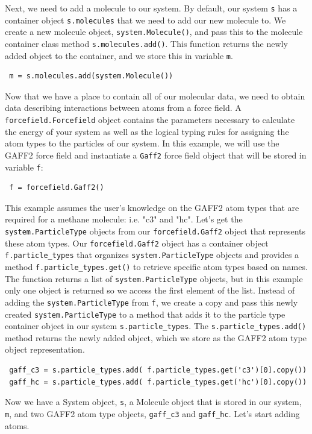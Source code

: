 \documentclass[9pt,tutorial]{livecoms}
\begin{document}
Next, we need to add a molecule to our system. By default, our system \lstinline$s$ has a container object \lstinline$s.molecules$ that we need to add our new molecule to. We create a new molecule object, \lstinline$system.Molecule()$, and pass this to the molecule container class method \lstinline$s.molecules.add()$. This function returns the newly added object to the container, and we store this in variable \lstinline$m$.

\begin{lstlisting}
 m = s.molecules.add(system.Molecule())
\end{lstlisting}

Now that we have a place to contain all of our molecular data, we need to obtain data describing interactions between atoms from a force field. A \lstinline$forcefield.Forcefield$ object contains the parameters necessary to calculate the energy of your system as well as the logical typing rules for assigning the atom types to the particles of our system. In this example, we will use the GAFF2 force field and instantiate a \lstinline$Gaff2$ force field object that will be stored in variable \lstinline$f$:

\begin{lstlisting}
 f = forcefield.Gaff2()
\end{lstlisting}



This example assumes the user's knowledge on the GAFF2 atom types that are required for a methane molecule: i.e. "c3" and "hc". Let's get the \lstinline$system.ParticleType$ objects from our \lstinline$forcefield.Gaff2$ object that represents these atom types. Our \lstinline$forcefield.Gaff2$ object has a container object \lstinline$f.particle_types$ that organizes \lstinline$system.ParticleType$ objects and provides a method \lstinline$f.particle_types.get()$ to retrieve specific atom types based on names. The function returns a list of \lstinline$system.ParticleType$ objects, but in this example only one object is returned so we access the first element of the list. Instead of adding the \lstinline$system.ParticleType$ from \lstinline$f$, we create a copy and pass this newly created \lstinline$system.ParticleType$  to a method that adds it to the particle type container object in our system \lstinline$s.particle_types$. The \lstinline$s.particle_types.add()$ method returns the newly added object, which we store as the GAFF2 atom type object representation.

\begin{lstlisting}
 gaff_c3 = s.particle_types.add( f.particle_types.get('c3')[0].copy())
 gaff_hc = s.particle_types.add( f.particle_types.get('hc')[0].copy())
\end{lstlisting}
Now we have a System object, \lstinline$s$, a Molecule object that is stored in our system, \lstinline$m$, and two GAFF2 atom type objects, \lstinline$gaff_c3$ and \lstinline$gaff_hc$. Let's start adding atoms.
\end{document}
